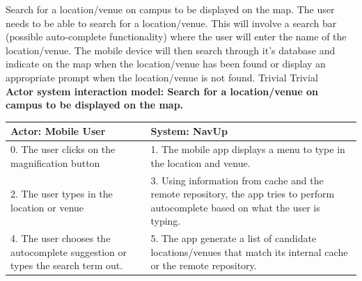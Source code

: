 \FuncReq
{Search for a location/venue on campus to be displayed on the map.}
{The user needs to be able to search for a location/venue. This will involve a search bar (possible auto-complete functionality) where the user will enter the name of the location/venue. The mobile device will then search through it's database and indicate on the map when the location/venue has been found or display an appropriate prompt when the location/venue is not found.}
{Trivial}
{Trivial}
    \\
    \textbf{Actor system interaction model: Search for a location/venue on campus to be displayed on the map. }\\
    \begin{tabular}{ | p{6cm} | p{6cm} |}
    \hline
    Actor: Mobile User & System: NavUp \\ \hline
    0. The user clicks on the magnification button & 1. The mobile app displays a menu to type in the location and venue.\\ \hline
    2. The user types in the location or venue & 3. Using information from cache and the remote repository, the app tries to perform autocomplete based on what the user is typing.\\ \hline
    4. The user chooses the autocomplete suggestion or types the search term out. & 5. The app generate a list of candidate locations/venues that match its internal cache or the remote repository.\\ \hline
    \end{tabular}
\\
\bigskip


